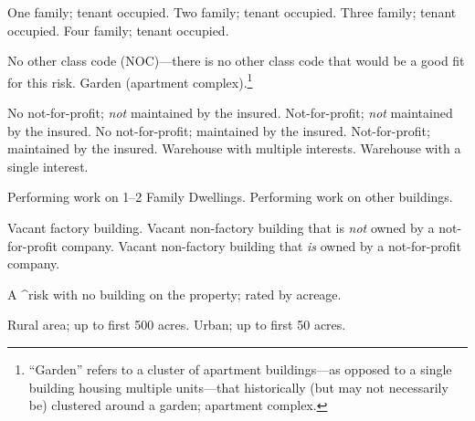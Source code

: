 \begin{description}
  \incompletei
    \begin{description}
       One family; tenant occupied.
       Two family; tenant occupied.
       Three family; tenant occupied.
       Four family; tenant occupied.
    \end{description}

  \incompletei
    \begin{description}
       No other class code (NOC)---there is no other class
      code that would be a good fit for this risk.
       Garden (apartment complex).\footnote{``Garden'' refers
      to a cluster of apartment buildings---as opposed to a single building
      housing multiple units---that historically (but may not necessarily be)
      clustered around a garden; apartment complex.%
      }

    \end{description}

  \incompletei
    \begin{description}
       No not-for-profit; \emph{not} maintained by the insured.
       Not-for-profit; \emph{not} maintained by the insured.
       No not-for-profit; maintained by the insured.
       Not-for-profit; maintained by the insured.
       Warehouse with multiple interests.
       Warehouse with a single interest.
    \end{description}

  \incompletei
    \begin{description}
       Performing work on 1--2 Family Dwellings.
       Performing work on other buildings.
    \end{description}

  \incompletei
    \begin{description}
       Vacant factory building.
       Vacant non-factory building that is \emph{not} owned
                         by a not-for-profit company.
       Vacant non-factory building that \emph{is} owned by a
                         not-for-profit company.
    \end{description}

    A ^risk with no building on the property; rated by acreage.
    \begin{description}
       Rural area; up to first 500 acres.
       Urban; up to first 50 acres.
    \end{description}

\end{description}
